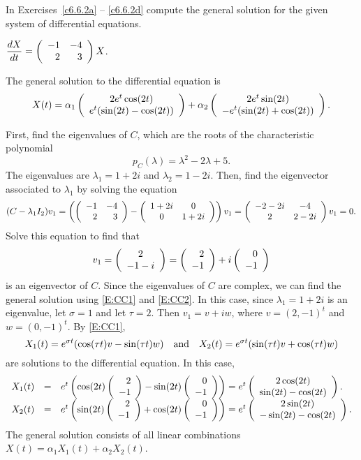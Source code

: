 \documentclass{ximera}
\begin{document}
In Exercises~\ref{c6.6.2a} -- \ref{c6.6.2d} compute the general solution for
the given system of differential equations.
\begin{exercise}  \label{c6.6.2a}
$\displaystyle\frac{dX}{dt} = \left(\begin{array}{rr} -1 & -4\\ 2 &3\end{array}\right) X$.

\begin{solution}

\ans The general solution to the differential equation is
\[
X(t) =
\alpha_1\left(\begin{array}{c} 2e^t\cos(2t) \\ e^t(\sin(2t) - \cos(2t))\end{array}\right) +
\alpha_2\left(\begin{array}{c} 2e^t\sin(2t) \\ -e^t(\sin(2t) + \cos(2t))\end{array}\right).
\]

\soln First, find the eigenvalues of $C$, which are the roots of the
characteristic polynomial
\[
p_C(\lambda) = \lambda^2 - 2\lambda + 5.
\]
The eigenvalues are $\lambda_1 = 1 + 2i$ and $\lambda_2 = 1 - 2i$.  Then,
find the eigenvector associated to $\lambda_1$ by solving the equation
\[
(C - \lambda_1I_2)v_1 =
\left(\left(\begin{array}{rr} -1 & -4\\ 2 &3\end{array}\right) - \left(\begin{array}{cc} 1 + 2i & 0\\ 0 &1 + 2i\end{array}\right)\right)v_1
= \left(\begin{array}{cc} -2 - 2i & -4\\ 2 &2 - 2i\end{array}\right)v_1 = 0.
\]
Solve this equation to find that
\[
v_1 = \left(\begin{array}{c} 2 \\ -1 - i\end{array}\right) = \left(\begin{array}{r} 2 \\ -1\end{array}\right) + i\left(\begin{array}{r} 0 \\ -1\end{array}\right)
\]
is an eigenvector of $C$.  Since the eigenvalues of $C$ are complex, we
can find the general solution using \eqref{E:CC1} and \eqref{E:CC2}.  In this
case, since $\lambda_1 = 1 + 2i$ is an eigenvalue, let $\sigma = 1$ and
let $\tau = 2$.  Then $v_1 = v + iw$, where $v = (2,-1)^t$ and
$w = (0,-1)^t$.  By \eqref{E:CC1},
\[
X_1(t) = e^{\sigma t}(\cos(\tau t)v - \sin(\tau t)w) \quad\mbox{and}\quad
X_2(t) = e^{\sigma t}(\sin(\tau t)v + \cos(\tau t)w)
\]
are solutions to the differential equation.  In this case,
\[
\begin{array}{rcl}
X_1(t) & = & e^t\left(\cos(2t)\left(\begin{array}{r} 2 \\ -1\end{array}\right) -
\sin(2t)\left(\begin{array}{r} 0 \\ -1\end{array}\right)\right)
= e^t\left(\begin{array}{c} 2\cos(2t) \\ \sin(2t) - \cos(2t)\end{array}\right). \\
X_2(t) & = & e^t\left(\sin(2t)\left(\begin{array}{r} 2 \\ -1\end{array}\right) +
\cos(2t)\left(\begin{array}{r} 0 \\ -1\end{array}\right)\right)
= e^t\left(\begin{array}{c} 2\sin(2t) \\ -\sin(2t) - \cos(2t)\end{array}\right).
\end{array}
\]
The general solution consists of all linear combinations
$X(t) = \alpha_1X_1(t) + \alpha_2X_2(t)$.


\end{solution}
\end{exercise}
\end{document}
